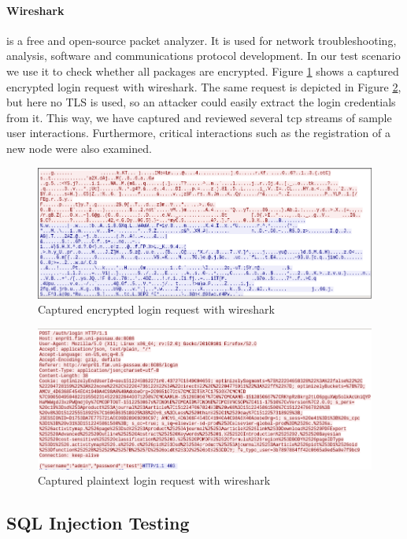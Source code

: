 \documentclass{scrreprt}
\begin{document}
\paragraph{Wireshark}
is a free and open-source packet analyzer. It is used for network troubleshooting, analysis, software and communications protocol development.
In our test scenario we use it to check whether all packages are encrypted. Figure \ref{wire} shows a captured encrypted login request with wireshark. The same request is depicted in Figure \ref{wire0}, but here no TLS is used, so an attacker could easily extract the login credentials from it. This way, we have captured and reviewed several tcp streams of sample user interactions. Furthermore, critical interactions such as the registration of a new node were also examined.
\begin{figure}[h!]
	\centering
	\includegraphics[width=17cm]{report/wire_login_ssl.png}
	\caption{Captured encrypted login request with wireshark}
	\label{wire}
\end{figure}
\begin{figure}[h!]
	\centering
	\includegraphics[width=17cm]{report/wire_login_.png}
	\caption{Captured plaintext login request with wireshark}
	\label{wire0}
\end{figure}


\subsection{SQL Injection Testing}
\end{document}

